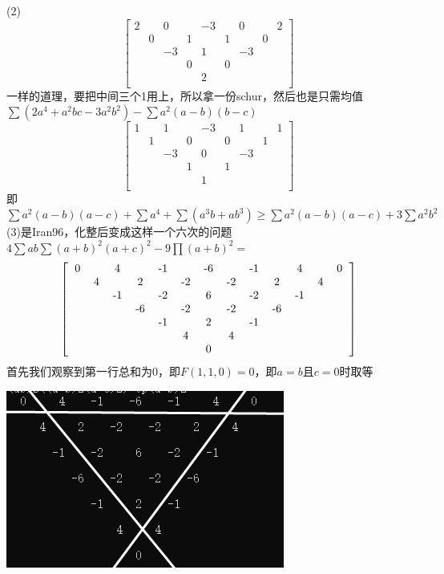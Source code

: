 \documentclass[UTF8]{ctexart}
\begin{document}
(2)\renewcommand*{\arraystretch}{1.732}\[\left[\begin{matrix}
	2& &0& &-3& &0& &2\\
	&0& &1& &1& &0&\\
	& &-3& &1& &-3& &\\
	& & &0& &0& & &\\
	& & & &2& & & &\\
\end{matrix}\right]\]
一样的道理，要把中间三个1用上，所以拿一份schur，然后也是只需均值\\
$ \displaystyle  \sum (2a^{4}+a^{2}bc-3a^{2}b^{2})-\displaystyle  \sum a^{2}(a-b)(b-c) $
\renewcommand*{\arraystretch}{1.732}\[\left[\begin{matrix}
	1& &1& &-3& &1& &1\\
	&1& &0& &0& &1&\\
	& &-3& &0& &-3& &\\
	& & &1& &1& & &\\
	& & & &1& & & &\\
\end{matrix}\right]\]
即$ \displaystyle \sum a^{2}(a-b)(a-c)+\displaystyle \sum a^{4}+\displaystyle \sum (a^{3}b+ab^{3})\geq \displaystyle \sum a^{2}(a-b)(a-c)+3\displaystyle \sum a^{2}b^{2}$\\
(3)是Iran96，化整后变成这样一个六次的问题\label{key3}\\
$ 4\displaystyle \sum ab\displaystyle \sum (a+b)^{2}(a+c)^{2}-9\displaystyle \prod (a+b)^{2}= $
\renewcommand*{\arraystretch}{1.732}\[\left[\begin{matrix}
	\begin{tabular}{ccccccccccccc}
		0& &4& &-1& &-6& &-1& &4& &0\\
		&4& &2& &-2& &-2& &2& &4&\\
		& &-1& &-2& &6& &-2& &-1& &\\
		& & &-6& &-2& &-2& &-6& & &\\
		& & & &-1& &2& &-1& & & &\\
		& & & & &4& &4& & & & &\\
		& & & & & &0& & & & & &\\
	\end{tabular}
\end{matrix}\right]\]
首先我们观察到第一行总和为$ 0 $，即$ F(1,1,0)=0 $，即$ a=b $且$ c=0 $时取等
\begin{center}
	\includegraphics[width=0.4\linewidth]{0220}
\end{center}
\end{document}
